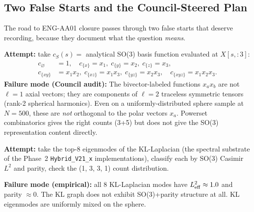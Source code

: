 \documentclass[12pt, a4paper]{article}
\begin{document}
\subsection{Two False Starts and the Council-Steered Plan}

The road to ENG-AA01 closure passes through two false starts that
deserve recording, because they document what the question
\emph{means}.

\begin{formalbox}[title={False Start 1: Hard-Coded Analytical Basis}]
\textbf{Attempt:} take $c_S(s) = $ analytical SO(3) basis function
evaluated at $X[s, :3]$:
\begin{align*}
  c_\varnothing &= 1,
  \quad
  c_{\{x\}} = x_1,\;
  c_{\{y\}} = x_2,\;
  c_{\{z\}} = x_3, \\
  c_{\{xy\}} &= x_1 x_2,\;
  c_{\{xz\}} = x_1 x_3,\;
  c_{\{yz\}} = x_2 x_3,
  \quad
  c_{\{xyz\}} = x_1 x_2 x_3.
\end{align*}
\textbf{Failure mode (Council audit):} The bivector-labeled
functions $x_a x_b$ are not $\ell = 1$ axial vectors; they are
components of $\ell = 2$ traceless symmetric tensors (rank-2
spherical harmonics). Even on a uniformly-distributed sphere
sample at $N = 500$, these are \emph{not} orthogonal to the polar
vectors $x_a$. Powerset combinatorics gives the right counts (3+5)
but does not give the SO(3) representation content directly.
\end{formalbox}

\begin{formalbox}[title={False Start 2: KL-Laplacian Eigenmode Basis}]
\textbf{Attempt:} take the top-8 eigenmodes of the KL-Laplacian
(the spectral substrate of the Phase~2 \texttt{Hybrid\_V21\_x}
implementations), classify each by SO(3) Casimir $L^2$ and parity,
check the (1, 3, 3, 1) count distribution.

\textbf{Failure mode (empirical):} all 8 KL-Laplacian modes have
$L_{\rm eff}^2 \approx 1.0$ and parity $\approx 0$. The KL graph
does not exhibit SO(3)+parity structure at all. KL eigenmodes are
uniformly mixed on the sphere.
\end{formalbox}
\end{document}

